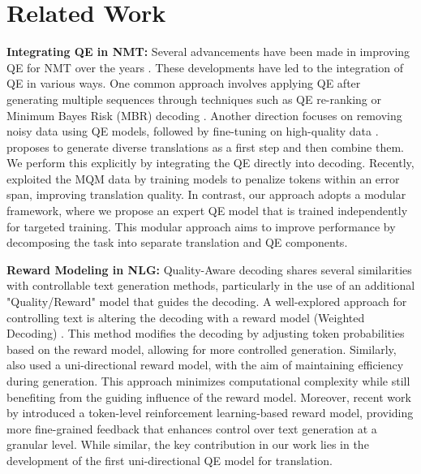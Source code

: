 \section{Related Work}
\textbf{Integrating QE in NMT:} Several advancements have been made in improving QE for NMT over the years \citep{rei2021references, rei2022cometkiwi, blain2023findings, zerva2024findings, guerreiro2024xcomet}. These developments have led to the integration of QE in various ways.
One common approach involves applying QE after generating multiple sequences through techniques such as QE re-ranking \citep{fernandes2022quality, faria2024quest} or Minimum Bayes Risk (MBR) decoding \citep{tomani2024quality}. Another direction focuses on removing noisy data using QE models, followed by fine-tuning on high-quality data \citep{xu2024contrastive, finkelstein2024introducing}. \citet{vernikos2024don} proposes to generate diverse translations as a first step and then combine them. We perform this explicitly by integrating the QE directly into decoding.
Recently, \citet{zhang2024learning} exploited the MQM data by training models to penalize tokens within an error span, improving translation quality. In contrast, our approach adopts a modular framework, where we propose an expert QE model that is trained independently for targeted training. This modular approach aims to improve performance by decomposing the task into separate translation and QE components.

\textbf{Reward Modeling in NLG:}  Quality-Aware decoding shares several similarities with controllable text generation methods, particularly in the use of an additional "Quality/Reward" model that guides the decoding. A well-explored approach for controlling text is altering the decoding with a reward model (Weighted Decoding) \citep{yang2021fudge}. This method modifies the decoding by adjusting token probabilities based on the reward model, allowing for more controlled generation.
Similarly, \citet{deng-raffel-2023-reward} also used a uni-directional reward model, with the aim of maintaining efficiency during generation. This approach minimizes computational complexity while still benefiting from the guiding influence of the reward model. Moreover, recent work by \citet{li-etal-2024-reinforcement} introduced a token-level reinforcement learning-based reward model, providing more fine-grained feedback that enhances control over text generation at a granular level. While similar, the key contribution in our work lies in the development of the first uni-directional QE model for translation.